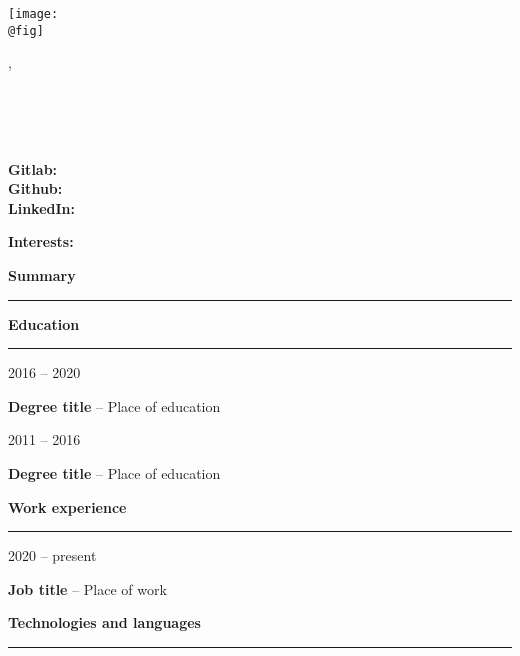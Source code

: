 \documentclass[10pt,A4]{article}
\author{Jane Doe}
\date{\today}
\makeatletter
\newcommand{\cvsection}[1]
{
    \begin{center}
	    \large\textcolor{maincolor}{\textbf{#1}}
	    \vspace{0.2cm}
	    \textcolor{sepcolor}{\hrule}
    \end{center}
}
\newcommand{\cvitem}[4] %
{
\begin{minipage}[t]{.15\textwidth} 
\centering
   \textcolor{maincolor}{#1} 
\end{minipage}
    \hfill
    \noindent
\begin{minipage}[t]{.82\textwidth}
{\textbf{#2}} -- \textcolor{maincolor}{#3}\\
{#4}
\end{minipage}
\vspace{0.2cm}
}
\newcommand{\cvtitle}
{
\begin{minipage}{.30\textwidth}
\centering
    \texttt{[image: \\@fig]}
\end{minipage}
    \hfill
    \noindent
\begin{minipage}{.68\textwidth}
\raggedright 
    {\textcolor{maincolor}{\Large\textbf{\theauthor}, \@degree}}\\
    \vspace{0.2cm}
    
    \begin{minipage}{.48\textwidth}
	{{\thedate}}\\
	{{\@address}}\\
    {{\@phone}}\\
	{{\@email}}
	\end{minipage}
    \hfill
    \noindent
    \begin{minipage}{.48\textwidth}
    \raggedright
	\textbf{Gitlab:} \@gitlab\\
	\textbf{Github:} \@github\\
	\textbf{LinkedIn:} \@linkedin
	\end{minipage}
	\vspace{0.4cm}
	
	{{\textbf{Interests:}} \@interests}
    \end{minipage}
    \vspace{0.2cm}
}
\makeatother
\begin{document}
\cvtitle

\cvsection{Summary}
\lipsum[1-1]

\cvsection{Education}
\cvitem{2016 -- 2020}{Degree title}{Place of education}{\lipsum[1-1]}
\cvitem{2011 -- 2016}{Degree title}{Place of education}{\lipsum[1-1]}
\clearpage %
\cvsection{Work experience}
\cvitem{2020 -- present}{Job title}{Place of work}{\lipsum[1-1]}
\cvsection{Technologies and languages}
{\lipsum[1-1]}
\end{document}
